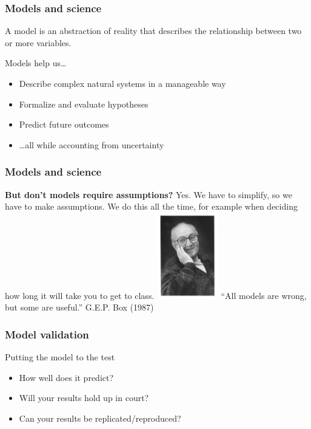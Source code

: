 \documentclass[color=usenames,dvipsnames]{beamer}\usepackage[]{graphicx}\usepackage[]{color}
\begin{document}
\begin{frame}
  \frametitle{Models and science}
  \large
  A model is an abstraction of reality that describes the relationship between two or more variables. \par
  \pause
  \vfill
  {%
    Models help us\dots}
  \begin{itemize}[<+->]
    \item Describe complex natural systems in a manageable way
    \item Formalize and evaluate hypotheses
    \item Predict future outcomes
    \item \dots all while accounting from uncertainty
  \end{itemize}
\end{frame}




\begin{frame}
  \frametitle{Models and science}
  \large
  {\bf But don't models require assumptions?}
  \pause
  \vfill
  Yes. %
  \pause
  \vfill
  We have to simplify, so we have to make assumptions.
  \pause
  \vfill
  We do this all the time, for example when deciding how long it will take you to get to class. 
  \pause
  \vfill
  \includegraphics[width=0.2\textwidth]{figs/Box}
  ``All models are wrong, but some are useful.'' G.E.P. Box (1987)
\end{frame}




\begin{frame}
  \frametitle{Model validation}
  \large
  {%
    Putting the model to the test}
  \begin{itemize}[<+->]
    \item How well does it predict?
    \item Will your results hold up in court?
    \item Can your results be replicated/reproduced?
  \end{itemize}
\end{frame}
\end{document}

